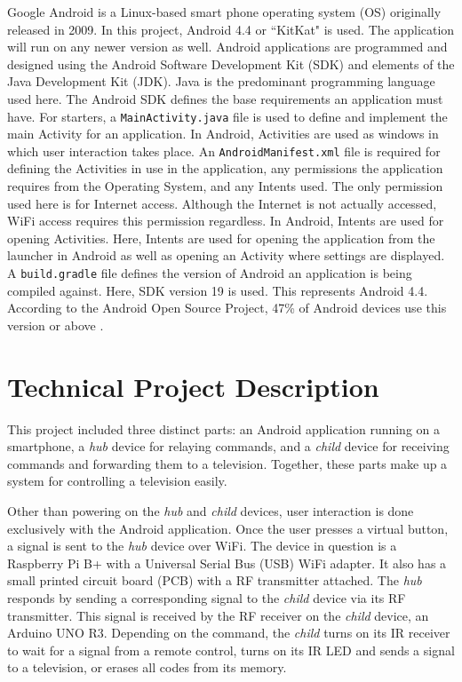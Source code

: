 \documentclass[12pt]{article}
\begin{document}
Google Android is a Linux-based smart phone operating system (OS) originally released in 2009. In this project, Android 4.4 or ``KitKat" is used. The application will run on any newer version as well. Android applications are programmed and designed using the Android Software Development Kit (SDK) and elements of the Java Development Kit (JDK). Java is the predominant programming language used here. The Android SDK defines the base requirements an application must have. For starters, a \texttt{MainActivity.java} file is used to define and implement the main Activity for an application. In Android, Activities are used as windows in which user interaction takes place. An \texttt{AndroidManifest.xml} file is required for defining the Activities in use in the application, any permissions the application requires from the Operating System, and any Intents used. The only permission used here is for Internet access. Although the Internet is not actually accessed, WiFi access requires this permission regardless.  In Android, Intents are used for opening Activities. Here, Intents are used for opening the application from the launcher in Android as well as opening an Activity where settings are displayed. A \texttt{build.gradle} file defines the version of Android an application is being compiled against. Here, SDK version 19 is used. This represents Android 4.4. According to the Android Open Source Project, 47\% of Android devices use this version or above \cite{aosp}.

\section*{Technical Project Description}
This project included three distinct parts: an Android application running on a smartphone, a \emph{hub} device for relaying commands, and a \emph{child} device for receiving commands and forwarding them to a television. Together, these parts make up a system for controlling a television easily.

Other than powering on the \emph{hub} and \emph{child} devices, user interaction is done exclusively with the Android application. Once the user presses a virtual button, a signal is sent to the \emph{hub} device over WiFi. The device in question is a Raspberry Pi B+ with a Universal Serial Bus (USB) WiFi adapter. It also has a small printed circuit board (PCB) with a RF transmitter attached. The \emph{hub} responds by sending a corresponding signal to the \emph{child} device via its RF transmitter. This signal is received by the RF receiver on the \emph{child} device, an Arduino UNO R3. Depending on the command, the \emph{child} turns on its IR receiver to wait for a signal from a remote control, turns on its IR LED and sends a signal to a television, or erases all codes from its memory.  
\end{document}

